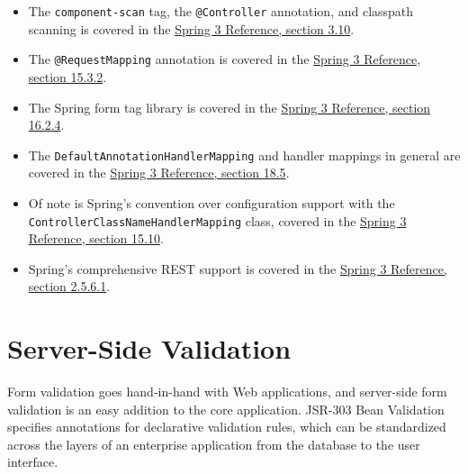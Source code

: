 \documentclass{article}
\begin{document}
\begin{itemize}

\item The \texttt{component-scan} tag, the \texttt{@Controller} annotation, and classpath scanning is covered in the \href{http://static.springsource.org/spring/docs/3.0.x/spring-framework-reference/html/beans.html#beans-classpath-scanning}{Spring 3 Reference, section 3.10}.

\item The \texttt{@RequestMapping} annotation is covered in the \href{http://static.springsource.org/spring/docs/3.0.x/spring-framework-reference/html/mvc.html#mvc-ann-requestmapping}{Spring 3 Reference, section 15.3.2}.

\item The Spring form tag library is covered in the \href{http://static.springsource.org/spring/docs/3.0.x/spring-framework-reference/html/view.html#view-jsp-formtaglib}{Spring 3 Reference, section 16.2.4}.

\item The \texttt{DefaultAnnotationHandlerMapping} and handler mappings in general are covered in the \href{http://static.springsource.org/spring/docs/3.0.x/spring-framework-reference/html/portlet.html#portlet-handlermapping}{Spring 3 Reference, section 18.5}.

\item Of note is Spring's convention over configuration support with the \texttt{ControllerClassNameHandlerMapping} class, covered in the \href{http://static.springsource.org/spring/docs/3.0.x/spring-framework-reference/html/mvc.html#mvc-coc}{Spring 3 Reference, section 15.10}.

\item Spring's comprehensive REST support is covered in the \href{http://static.springsource.org/spring/docs/3.0.x/spring-framework-reference/html/new-in-3.html#d0e1188}{Spring 3 Reference, section 2.5.6.1}.

\end{itemize}

\pagebreak
\section{Server-Side Validation}

Form validation goes hand-in-hand with Web applications, and server-side form validation is an easy addition to the core application.  JSR-303 Bean Validation specifies annotations for declarative validation rules, which can be standardized across the layers of an enterprise application from the database to the user interface.
\end{document}
